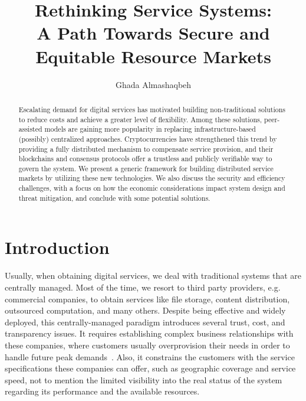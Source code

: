 \documentclass{llncs}
\begin{document}
%
\title{\Large \bf Rethinking Service Systems: \\
A Path Towards Secure and Equitable Resource Markets
}


\author{Ghada Almashaqbeh} 
%
%

\maketitle


\begin{abstract}
Escalating demand for digital services has motivated building non-traditional solutions to reduce costs and achieve a greater level of flexibility. Among these solutions, peer-assisted models are gaining more popularity in replacing infrastructure-based (possibly) centralized approaches. Cryptocurrencies have strengthened this trend by providing a fully distributed mechanism to compensate service provision, and their blockchains and consensus protocols offer a trustless and publicly verifiable way to govern the system. We present a generic framework for building distributed service markets by utilizing these new technologies. We also discuss the security and efficiency challenges, with a focus on how the economic considerations impact system design and threat mitigation, and conclude with some potential solutions.
\end{abstract}


\section{Introduction}
Usually, when obtaining digital services, we deal with traditional systems that are centrally managed. Most of the time, we resort to third party providers, e.g. commercial companies, to obtain services like file storage, content distribution, outsourced computation, and many others. Despite being effective and widely deployed, this centrally-managed paradigm introduces several trust, cost, and transparency issues. It requires establishing complex business relationships with these companies, where customers usually overprovision their needs in order to handle future peak demands~\cite{Kassa13,Nicolae14}. Also, it constrains the customers with the service specifications these companies can offer, such as geographic coverage and service speed, not to mention the limited visibility into the real status of the system regarding its performance and the available resources.
\end{document}
